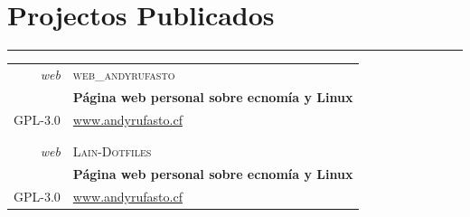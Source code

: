 \documentclass[a4paper,10pt]{article}
\begin{document}
\newpage

\section{Projectos Publicados}
\hrule
\begin{tabular}{r|p{11cm}}
  \emph{web}                  & \textsc{web\_andyrufasto}\\
	                            & \textbf{Página web personal sobre ecnomía y Linux} \\
	\textsc{GPL-3.0}            & \href{https://www.andyrufasto.cf}{www.andyrufasto.cf}\\
				                      & \footnotesize{}\\\multicolumn{2}{c}{} \\

				\emph{web}                  & \textsc{Lain-Dotfiles}\\
	                            & \textbf{Página web personal sobre ecnomía y Linux} \\
	\textsc{GPL-3.0}            & \href{https://www.andyrufasto.cf}{www.andyrufasto.cf}
															
\end{tabular}
\end{document}
